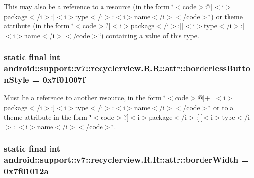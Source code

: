 This may also be a reference to a resource (in the form \char`\"{}$<$code$>$@\mbox{[}$<$i$>$package$<$/i$>$:\mbox{]}$<$i$>$type$<$/i$>$:$<$i$>$name$<$/i$>$$<$/code$>$\char`\"{}) or theme attribute (in the form \char`\"{}$<$code$>$?\mbox{[}$<$i$>$package$<$/i$>$:\mbox{]}\mbox{[}$<$i$>$type$<$/i$>$:\mbox{]}$<$i$>$name$<$/i$>$$<$/code$>$\char`\"{}) containing a value of this type. \hypertarget{classandroid_1_1support_1_1v7_1_1recyclerview_1_1_r_1_1attr_19c349c57e1a5edb18a4b1999d06f0c3}{
\subsubsection[{borderlessButtonStyle}]{\setlength{\rightskip}{0pt plus 5cm}static final int android::support::v7::recyclerview.R.R::attr::borderlessButtonStyle = 0x7f01007f}}
\label{classandroid_1_1support_1_1v7_1_1recyclerview_1_1_r_1_1attr_19c349c57e1a5edb18a4b1999d06f0c3}


Must be a reference to another resource, in the form \char`\"{}$<$code$>$@\mbox{[}+\mbox{]}\mbox{[}$<$i$>$package$<$/i$>$:\mbox{]}$<$i$>$type$<$/i$>$:$<$i$>$name$<$/i$>$$<$/code$>$\char`\"{} or to a theme attribute in the form \char`\"{}$<$code$>$?\mbox{[}$<$i$>$package$<$/i$>$:\mbox{]}\mbox{[}$<$i$>$type$<$/i$>$:\mbox{]}$<$i$>$name$<$/i$>$$<$/code$>$\char`\"{}. \hypertarget{classandroid_1_1support_1_1v7_1_1recyclerview_1_1_r_1_1attr_02f825c7e9695394904b27a93ab22916}{
\subsubsection[{borderWidth}]{\setlength{\rightskip}{0pt plus 5cm}static final int android::support::v7::recyclerview.R.R::attr::borderWidth = 0x7f01012a}}
\label{classandroid_1_1support_1_1v7_1_1recyclerview_1_1_r_1_1attr_02f825c7e9695394904b27a93ab22916}


